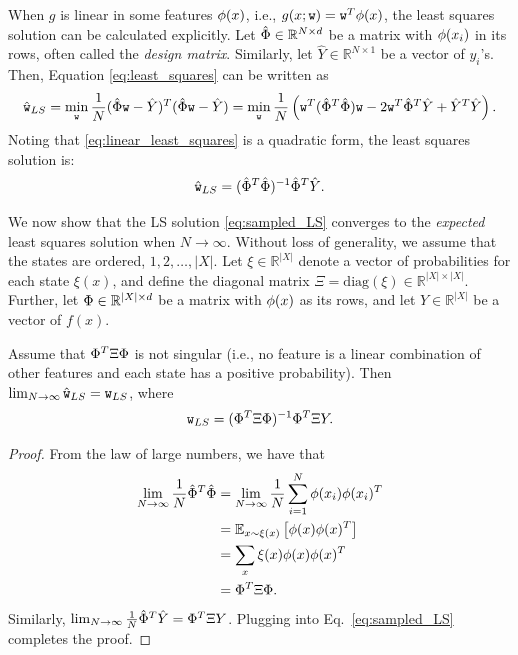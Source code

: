 When $g$ is linear in some features $\phi(x)$, i.e., $g(x;{\tt w}) = {\tt w}^T \phi(x)$, the least squares solution can be calculated explicitly. Let $\hat{\Phi} \in \mathbb{R}^{N \times d}$ be a matrix with $\phi(x_i)$ in its rows, often called the \textit{design matrix}. Similarly, let $\hat{Y}\in \mathbb{R}^{N \times 1}$ be a vector of $y_i$'s. Then, Equation \eqref{eq:least_squares} can be written as
\begin{equation}\label{eq:linear_least_squares}
\hat{{\tt w}}_{LS} = \min_{\tt w} \frac{1}{N} (\hat{\Phi} {\tt w} - \hat{Y})^T(\hat{\Phi} {\tt w} - \hat{Y}) = 
\min_{\tt w} \frac{1}{N} \left( {\tt w}^T (\hat{\Phi}^T \hat{\Phi}) {\tt w} -2 {\tt w}^T \hat{\Phi}^T \hat{Y} + \hat{Y}^T\hat{Y} \right).
\end{equation}
Noting that \eqref{eq:linear_least_squares} is a quadratic form, the least squares solution is: 
\begin{equation}\label{eq:sampled_LS}
    \hat{{\tt w}}_{LS} = (\hat{\Phi}^T \hat{\Phi})^{-1} \hat{\Phi}^T \hat{Y}.
\end{equation}

We now show that the LS solution \eqref{eq:sampled_LS} converges to the \textit{expected} least squares solution when $N \to \infty$.
Without loss of generality, we assume that the states are ordered, $1,2,\dots,|X|$. Let $\xi\in \mathbb{R}^{|X|}$ denote a vector of probabilities for each state $\xi(x)$, and define the diagonal matrix
$\Xi = \text{diag}(\xi)\in\mathbb{R}^{|X| \times |X|}$. Further, let $\Phi \in \mathbb{R}^{|X| \times d}$ be a matrix with $\phi(x)$ as its rows, and let $Y\in \mathbb{R}^{|X|}$ be a vector of $f(x)$.


\begin{proposition}
Assume that $\Phi^T \Xi \Phi$ is not singular (i.e., no feature is a linear combination of other features and each state has a positive probability). Then $\lim_{N \to \infty} \hat{{\tt w}}_{LS} = {\tt w}_{LS}$, where
\begin{equation*}
    {\tt w}_{LS} = (\Phi^T \Xi \Phi)^{-1} \Phi^T \Xi Y.
\end{equation*}
\end{proposition}

\begin{proof}
From the law of large numbers, we have that 
\begin{equation*}
\begin{split}
    \lim_{N \to \infty}\frac{1}{N}\hat{\Phi}^T \hat{\Phi} &= \lim_{N \to \infty}\frac{1}{N} \sum_{i=1}^N \phi(x_i) \phi(x_i)^T \\
    &= \mathbb{E}_{x \sim \xi(x)}\left[ \phi(x) \phi(x)^T \right] \\
    &= \sum_{x} \xi(x) \phi(x) \phi(x)^T \\
    &= \Phi^T \Xi \Phi.
\end{split}
\end{equation*}
Similarly, $\lim_{N \to \infty}\frac{1}{N} \hat{\Phi}^T \hat{Y} = \Phi^T \Xi Y$. Plugging into Eq.~\eqref{eq:sampled_LS} completes the proof.
\end{proof}


